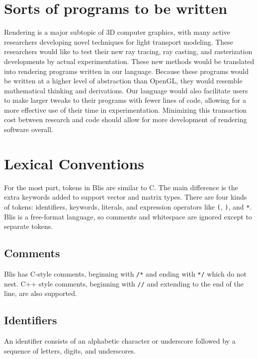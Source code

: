 \documentclass[11pt]{article}
\newcommand{\code}[1]{\texttt{#1}}
\begin{document}
\section{Sorts of programs to be written}
    Rendering is a major subtopic of 3D computer graphics, with many active 
    researchers developing novel techniques for light transport modeling. These 
    researchers would like to test their new ray tracing, ray casting, and 
    rasterization developments by actual experimentation. These new methods would be 
    translated into rendering programs written in our language. Because these 
    programs would be written at a higher level of abstraction than OpenGL, they 
    would resemble mathematical thinking and derivations. Our language would also 
    facilitate users to make larger tweaks to their programs with fewer lines of 
    code, allowing for a more effective use of their time in experimentation. 
    Minimizing this transaction cost between research and code should allow for more 
    development of rendering software overall.

\section{Lexical Conventions}

For the most part, tokens in Blis are similar to C. The main difference is the extra keywords added to support vector and matrix types. There are four kinds of tokens: identifiers, keywords, literals, and expression operators like \code{(}, \code{)}, and \code{*}. Blis is a free-format language, so comments and whitespace are ignored except to separate tokens.

\subsection{Comments}

Blis has C-style comments, beginning with \code{/*} and ending with \code{*/} which do not nest. C++ style comments, beginning with \code{//} and extending to the end of the line, are also supported.

\subsection{Identifiers}

An identifier consists of an alphabetic character or underscore followed by a sequence of letters, digits, and underscores.
\end{document}
